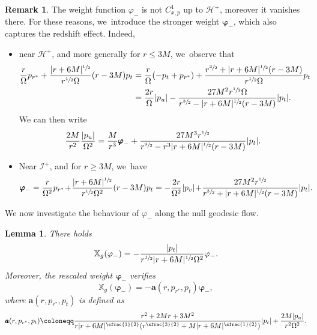 \documentclass[10pt]{amsart}
\theoremstyle{plain}
\newtheorem{lemma}[proposition]{Lemma}
\theoremstyle{definition}
\newtheorem{remark}[proposition]{Remark}
\newcommand\T{{\mathbb{X}}}
\renewcommand\H{{\mathcal{H}^+}}
\begin{document}
\begin{remark}\label{RkvarphiHplus}
The weight function $\varphi_-$ is not $C^1_{x,p}$ up to $\H$, moreover it vanishes there. For these reasons, we~introduce the stronger weight $\pmb{\varphi}_-$, which also captures the redshift effect. Indeed,
\begin{itemize}
\item near $\mathcal{H}^+$, and more generally for $r \leq 3M$, we~observe that
\begin{align*}
\frac{r}{\Omega}p_{r^*}+\frac{|r+6M|^{\sfrac{1}{2}}}{r^{\sfrac{1}{2}}\Omega}(r-3M)p_t & =\frac{r}{\Omega}(-p_t+p_{r^*})+\frac{r^{\sfrac{3}{2}}+|r+6M|^{\sfrac{1}{2}}(r-3M)}{r^{\sfrac{1}{2}} \Omega}p_t \\
& = \frac{2r}{\Omega}|p_u|- \frac{27M^2r^{\sfrac{1}{2}}\Omega}{r^{\sfrac{3}{2}}-|r+6M|^{\sfrac{1}{2}}(r-3M)} |p_t|.
\end{align*}
We can then write
\[
\frac{2M}{r^2}\frac{|p_u|}{\Omega^2}= \frac{M}{r^3}\pmb{\varphi}_- + \frac{27M^3r^{\sfrac{1}{2}}}{r^{\sfrac{9}{2}}-r^3|r+6M|^{\sfrac{1}{2}}(r-3M)} |p_t|.
\]
\item Near $\mathcal{I}^+$, and for $r \geq 3M$, we~have
\begin{align*}
\pmb{\varphi}_-=\frac{r}{\Omega^2}p_{r^*}\!+\!\frac{|r+6M|^{\sfrac{1}{2}}}{r^{\sfrac{1}{2}}\Omega^2}(r-3M)p_t & = -\frac{2r}{\Omega^2}|p_v|\!+\! \frac{27M^2r^{\sfrac{1}{2}}}{r^{\sfrac{3}{2}}+|r+6M|^{\sfrac{1}{2}}(r-3M)} |p_t|.
\end{align*}
\end{itemize}
\end{remark}

We now investigate the behaviour of $\varphi_-$ along the null geodesic flow.

\begin{lemma}\label{Lemphiminus}
There holds
\[
\T_g(\varphi_-)= - \frac{ |p_t|}{r^{\sfrac{1}{2}}|r+6M|^{\sfrac{1}{2}} \Omega^2}\varphi_{-}.
\]
Moreover, the rescaled weight $\pmb{\varphi}_-$ verifies
\[
\T_g(\pmb{\varphi}_-) = - \pmb{a}(r,p_{r^*},p_t) \pmb{\varphi}_-,
\]
where $\pmb{a}(r,p_{r^*},p_t)$ is defined as
\[
\pmb{a}(r,p_{r^*},p_t)\coloneqq\frac{r^2+2Mr+3M^2}{r|r+6M|^{\sfrac{1}{2}}(r^{\sfrac{3}{2}}+M|r+6M|^{\sfrac{1}{2}}) }|p_t| +\frac{2M|p_u|}{r^2\Omega^2}.
\]
\end{lemma}
\end{document}

